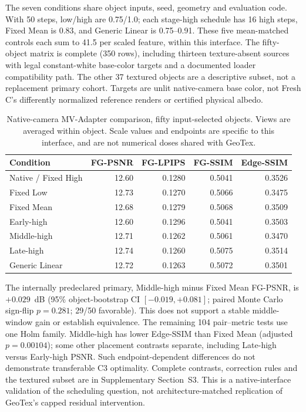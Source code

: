 \documentclass[times,twocolumn,final]{elsarticle}
\begin{document}
The seven conditions share object inputs, seed, geometry and evaluation code. With 50 steps, low/high are 0.75/1.0; each stage-high schedule has 16 high steps, Fixed Mean is 0.83, and Generic Linear is 0.75--0.91. These five mean-matched controls each sum to 41.5 per scaled feature, within this interface. The fifty-object matrix is complete (350 rows), including thirteen texture-absent sources with legal constant-white base-color targets and a documented loader compatibility path. The other 37 textured objects are a descriptive subset, not a replacement primary cohort. Targets are unlit native-camera base color, not Fresh C's differently normalized reference renders or certified physical albedo.

\begin{table}[ht]\centering\scriptsize
\caption{Native-camera MV-Adapter comparison, fifty input-selected objects. Views are averaged within object. Scale values and endpoints are specific to this interface, and are not numerical doses shared with GeoTex.}\label{tab:new-mva}
\begin{tabular}{lrrrr}
\toprule Condition & FG-PSNR & FG-LPIPS & FG-SSIM & Edge-SSIM \\
\midrule
Native / Fixed High & 12.60 & 0.1280 & 0.5041 & 0.3526 \\
Fixed Low & 12.73 & 0.1270 & 0.5066 & 0.3475 \\
Fixed Mean & 12.68 & 0.1279 & 0.5068 & 0.3509 \\
Early-high & 12.60 & 0.1296 & 0.5041 & 0.3503 \\
Middle-high & 12.71 & 0.1262 & 0.5061 & 0.3470 \\
Late-high & 12.74 & 0.1260 & 0.5075 & 0.3514 \\
Generic Linear & 12.72 & 0.1263 & 0.5072 & 0.3501 \\
\bottomrule\end{tabular}\end{table}

The internally predeclared primary, Middle-high minus Fixed Mean FG-PSNR, is $+0.029$~dB (95\% object-bootstrap CI $[-0.019,+0.081]$; paired Monte Carlo sign-flip $p=0.281$; 29/50 favorable). This does not support a stable middle-window gain or establish equivalence. The remaining 104 pair--metric tests use one Holm family. Middle-high has lower Edge-SSIM than Fixed Mean (adjusted $p=0.00104$); some other placement contrasts separate, including Late-high versus Early-high PSNR. Such endpoint-dependent differences do not demonstrate transferable C3 optimality. Complete contrasts, correction rules and the textured subset are in Supplementary Section~S3. This is a native-interface validation of the scheduling question, not architecture-matched replication of GeoTex's capped residual intervention.
\end{document}
